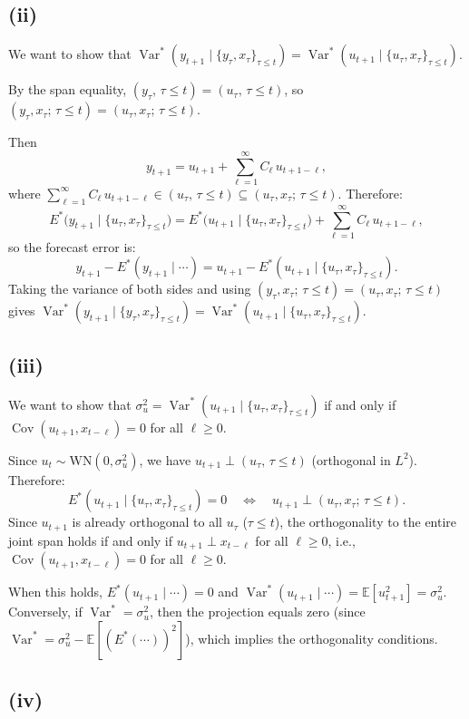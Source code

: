 \documentclass[11pt]{article}
\newcommand{\Var}{\operatorname{Var}}
\newcommand{\Cov}{\operatorname{Cov}}
\newcommand{\E}{\mathbb{E}}
\begin{document}
\subsection{(ii)}

We want to show that $\Var^*(y_{t+1} \mid \{y_\tau,x_\tau\}_{\tau\le t}) = \Var^*(u_{t+1} \mid \{u_\tau,x_\tau\}_{\tau\le t})$.

By the span equality, $(y_\tau,\,\tau\le t) = (u_\tau,\,\tau\le t)$, so $(y_\tau,x_\tau;\,\tau\le t) = (u_\tau,x_\tau;\,\tau\le t)$.

Then
\[
y_{t+1} = u_{t+1} + \sum_{\ell=1}^{\infty} C_\ell\, u_{t+1-\ell},
\]
where $\sum_{\ell=1}^{\infty} C_\ell\, u_{t+1-\ell} \in (u_\tau,\,\tau\le t) \subseteq (u_\tau,x_\tau;\,\tau\le t)$. Therefore:
\[
E^*\bigl(y_{t+1} \mid \{u_\tau,x_\tau\}_{\tau\le t}\bigr) = E^*\bigl(u_{t+1} \mid \{u_\tau,x_\tau\}_{\tau\le t}\bigr) + \sum_{\ell=1}^{\infty} C_\ell\, u_{t+1-\ell},
\]
so the forecast error is:
\[
y_{t+1} - E^*(y_{t+1} \mid \cdots) = u_{t+1} - E^*(u_{t+1} \mid \{u_\tau,x_\tau\}_{\tau\le t}).
\]
Taking the variance of both sides and using $(y_\tau,x_\tau;\,\tau\le t) = (u_\tau,x_\tau;\,\tau\le t)$ gives
$\Var^*(y_{t+1} \mid \{y_\tau,x_\tau\}_{\tau\le t}) = \Var^*(u_{t+1} \mid \{u_\tau,x_\tau\}_{\tau\le t})$.

\subsection{(iii)}

We want to show that $\sigma_u^2 = \Var^*(u_{t+1} \mid \{u_\tau,x_\tau\}_{\tau\le t})$ if and only if $\Cov(u_{t+1},x_{t-\ell})=0$ for all $\ell\ge 0$.

Since $u_t \sim \text{WN}(0,\sigma_u^2)$, we have $u_{t+1} \perp (u_\tau,\,\tau\le t)$ (orthogonal in $L^2$). Therefore:
\[
E^*(u_{t+1} \mid \{u_\tau,x_\tau\}_{\tau\le t}) = 0 \quad\Longleftrightarrow\quad u_{t+1} \perp (u_\tau,x_\tau;\,\tau\le t).
\]
Since $u_{t+1}$ is already orthogonal to all $u_\tau$ ($\tau\le t$), the orthogonality to the entire joint span holds if and only if $u_{t+1} \perp x_{t-\ell}$ for all $\ell \ge 0$, i.e., $\Cov(u_{t+1},x_{t-\ell})=0$ for all $\ell \ge 0$.

When this holds, $E^*(u_{t+1} \mid \cdots) = 0$ and $\Var^*(u_{t+1}\mid\cdots) = \E[u_{t+1}^2] = \sigma_u^2$. Conversely, if $\Var^* = \sigma_u^2$, then the projection equals zero (since $\Var^* = \sigma_u^2 - \E[(E^*(\cdots))^2]$), which implies the orthogonality conditions.

\subsection{(iv)}
\end{document}
